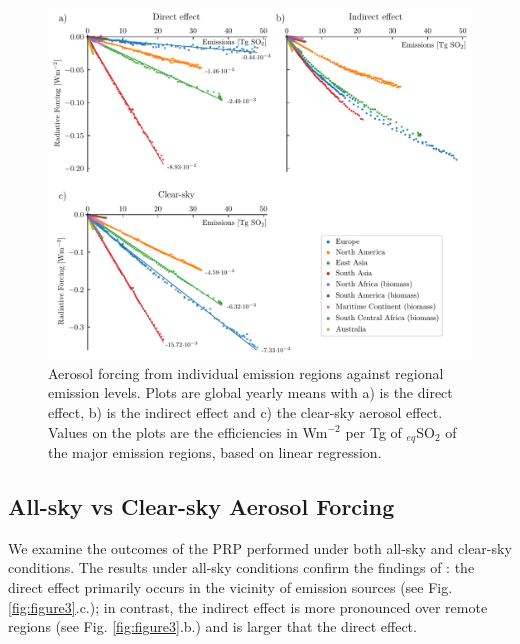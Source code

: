 \documentclass[draft]{agujournal2019}
\begin{document}
      \begin{figure}
            \centering
            \includegraphics[width=\textwidth]{../../figures/figure2}
            \caption{Aerosol forcing from individual emission regions against regional emission levels. Plots are global yearly means with a) is the direct effect, b) is the indirect effect and c) the clear-sky aerosol effect. Values on the plots are the efficiencies in Wm$^{-2}$ per Tg of $_{eq}$SO$_2$ of the major emission regions, based on linear regression.}
      \label{fig:figure2}
      \end{figure}

      \subsection{All-sky vs Clear-sky Aerosol Forcing}\label{sec:clear-sky}
            We examine the outcomes of the PRP performed under both all-sky and clear-sky conditions. The results under all-sky conditions confirm the findings of : the direct effect primarily occurs in the vicinity of emission sources (see Fig. \ref{fig:figure3}.c.); in contrast, the indirect effect is more pronounced over remote regions (see Fig. \ref{fig:figure3}.b.) and is larger that the direct effect.
            
\end{document}
